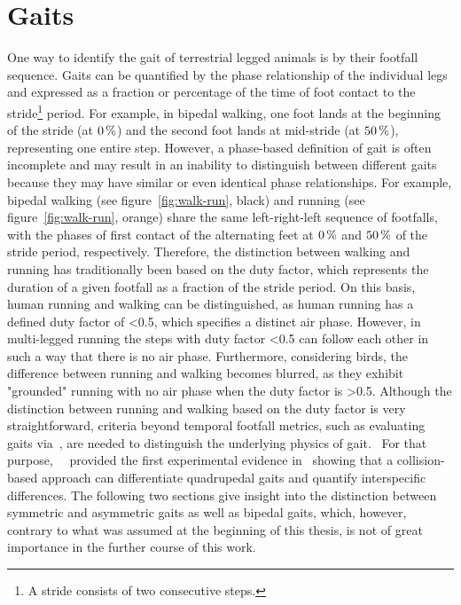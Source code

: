 \section{Gaits}

One way to identify the gait of terrestrial legged animals is by their footfall sequence. Gaits can be quantified by the phase relationship of the individual legs and expressed as a fraction or percentage of the time of foot contact to the stride\footnote{A stride consists of two consecutive steps.} period. For example, in bipedal walking, one foot lands at the beginning of the stride (\ie at$~0\,\textrm{\si{\percent}}$) and the second foot lands at mid-stride (\ie at$~50\,\textrm{\si{\percent}}$), representing one entire step. However, a phase-based definition of gait is often incomplete and may result in an inability to distinguish between different gaits because they may have similar or even identical phase relationships. For example, bipedal walking (see figure~\ref{fig:walk-run}, black) and running (see figure~\ref{fig:walk-run}, orange) share the same left-right-left sequence of footfalls, with the phases of first contact of the alternating feet at$~0\,\textrm{\si{\percent}}$ and$~50\,\textrm{\si{\percent}}$ of the stride period, respectively. Therefore, the distinction between walking and running has traditionally been based on the duty factor, which represents the duration of a given footfall as a fraction of the stride period. On this basis, human running and walking can be distinguished, as human running has a defined duty factor of <0.5, which specifies a distinct air phase. However, in multi-legged running the steps with duty factor <0.5 can follow each other in such a way that there is no air phase. Furthermore, considering birds, the difference between running and walking becomes blurred, as they exhibit "grounded" running with no air phase when the duty factor is >0.5. Although the distinction between running and walking based on the duty factor is very straightforward, criteria beyond temporal footfall metrics, such as evaluating gaits via~, are needed to distinguish the underlying physics of gait.~\cite{Lee2018} For that purpose,~\citeauthor*{Lee2011}~\cite{Lee2011} provided the first experimental evidence in~\citeyear{Lee2011} showing that a collision-based approach can differentiate quadrupedal gaits and quantify interspecific differences. The following two sections give insight into the distinction between symmetric and asymmetric gaits as well as bipedal gaits, which, however, contrary to what was assumed at the beginning of this thesis, is not of great importance in the further course of this work.

